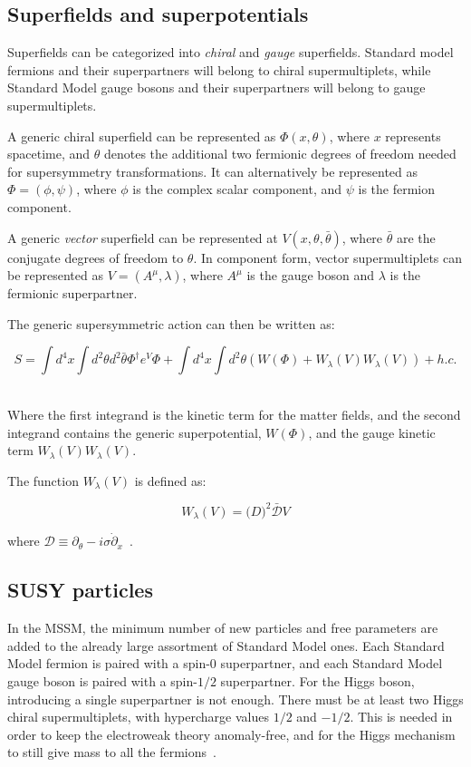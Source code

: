\subsection{Superfields and superpotentials}\label{subsec:susy_superfields}
Superfields can be categorized into \textit{chiral} and \textit{gauge} superfields.
Standard model fermions and their superpartners will belong to chiral supermultiplets,
while Standard Model gauge bosons and their superpartners will belong to gauge supermultiplets.

A generic chiral superfield can be represented as $\Phi(x, \theta)$, where $x$ represents spacetime,
and $\theta$ denotes the additional two fermionic degrees of freedom needed for supersymmetry transformations.
It can alternatively be represented as $\Phi = \left(\phi, \psi \right)$, where $\phi$ is the complex scalar component,
and $\psi$ is the fermion component.

A generic \textit{vector} superfield can be represented at $V(x, \theta, \bar{\theta})$,
where $\bar{\theta}$ are the conjugate degrees of freedom to $\theta$.
In component form, vector supermultiplets can be represented as $V = \left(A^{\mu}, \lambda\right)$,
where $A^{\mu}$ is the gauge boson and $\lambda$ is the fermionic superpartner.

The generic supersymmetric action can then be written as:

\begin{equation}\label{eq:susy_action}
    S = \int d^4 x \int d^2 \theta d^2 \bar{\theta} \Phi^{\dagger} e^V \Phi
        + \int d^4 x \int d^2 \theta \left(W(\Phi) + W_{\lambda}(V)W_{\lambda}(V)\right)+h.c.
\end{equation}~\cite{susy-unification-1998}

Where the first integrand is the kinetic term for the matter fields,
and the second integrand contains the generic superpotential, $W(\Phi)$,
and the gauge kinetic term $W_{\lambda}(V)W_{\lambda}(V)$.

The function $W_{\lambda}(V)$ is defined as:

\begin{equation}\label{eq:susy_gauge_potential}
    W_{\lambda}(V) = \mathcal(D)^{2}\bar{\mathcal{D}}V
\end{equation}

where $\mathcal{D} \equiv \partial_{\theta}-i\sigma\dot \partial_x$~\cite{susy-unification-1998}.

\subsection{SUSY particles}\label{subsec:susy_mssm}
In the MSSM, the minimum number of new particles and free parameters are added to the already large assortment of Standard Model ones.
Each Standard Model fermion is paired with a spin-$0$ superpartner, and each Standard Model gauge boson is paired with a spin-$1/2$ superpartner.
For the Higgs boson, introducing a single superpartner is not enough.
There must be at least two Higgs chiral supermultiplets, with hypercharge values $1/2$ and $-1/2$.
This is needed in order to keep the electroweak theory anomaly-free, and for the Higgs mechanism to still give mass to all the fermions~\cite{susy-primer-1998}.

